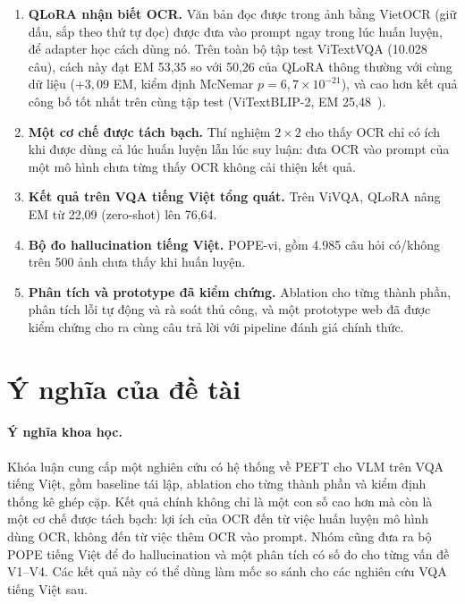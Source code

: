 \begin{enumerate}
  \item \textbf{QLoRA nhận biết OCR.} Văn bản đọc được trong ảnh bằng VietOCR
  (giữ dấu, sắp theo thứ tự đọc) được đưa vào prompt ngay trong lúc huấn luyện,
  để adapter học cách dùng nó. Trên toàn bộ tập test ViTextVQA (10.028 câu),
  cách này đạt EM 53,35 so với 50,26 của QLoRA thông thường với cùng dữ liệu
  ($+3{,}09$ EM, kiểm định McNemar $p = 6{,}7\times10^{-21}$), và cao hơn kết quả
  công bố tốt nhất trên cùng tập test (ViTextBLIP-2, EM
  25,48~\cite{nguyen2024vitextvqa}).
  \item \textbf{Một cơ chế được tách bạch.} Thí nghiệm $2\times2$ cho thấy OCR
  chỉ có ích khi được dùng cả lúc huấn luyện lẫn lúc suy luận: đưa OCR vào prompt
  của một mô hình chưa từng thấy OCR không cải thiện kết quả.
  \item \textbf{Kết quả trên VQA tiếng Việt tổng quát.} Trên ViVQA, QLoRA nâng
  EM từ 22,09 (zero-shot) lên 76,64.
  \item \textbf{Bộ đo hallucination tiếng Việt.} POPE-vi, gồm 4.985 câu hỏi
  có/không trên 500 ảnh chưa thấy khi huấn luyện.
  \item \textbf{Phân tích và prototype đã kiểm chứng.} Ablation cho từng thành
  phần, phân tích lỗi tự động và rà soát thủ công, và một prototype web đã được kiểm
  chứng cho ra cùng câu trả lời với pipeline đánh giá chính thức.
\end{enumerate}

\section{Ý nghĩa của đề tài}
\label{sec:intro-significance}

\paragraph{Ý nghĩa khoa học.} Khóa luận cung cấp một nghiên cứu có hệ thống về
PEFT cho VLM trên VQA tiếng Việt, gồm baseline tái lập, ablation cho từng thành
phần và kiểm định thống kê ghép cặp. Kết quả chính không chỉ là một con số cao
hơn mà còn là một cơ chế được tách bạch: lợi ích của OCR đến từ việc huấn luyện
mô hình dùng OCR, không đến từ việc thêm OCR vào prompt. Nhóm cũng đưa ra bộ
POPE tiếng Việt để đo hallucination và một phân tích có số đo cho từng vấn đề
V1--V4. Các kết quả này có thể dùng làm mốc so sánh cho các nghiên cứu VQA tiếng
Việt sau.

